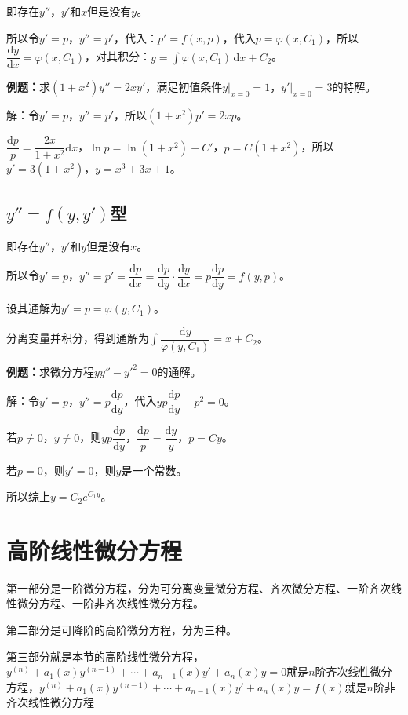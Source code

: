 \documentclass[UTF8, 12pt]{ctexart}
\begin{document}
即存在$y''$，$y'$和$x$但是没有$y$。

所以令$y'=p$，$y''=p'$，代入：$p'=f(x,p)$，代入$p=\varphi(x,C_1)$，所以$\dfrac{\textrm{d}y}{\textrm{d}x}=\varphi(x,C_1)$，对其积分：$y=\int\varphi(x,C_1)\,\textrm{d}x+C_2$。

\textbf{例题：}求$(1+x^2)y''=2xy'$，满足初值条件$y\vert_{x=0}=1$，$y'\vert_{x=0}=3$的特解。

解：令$y'=p$，$y''=p'$，所以$(1+x^2)p'=2xp$。

$\dfrac{\textrm{d}p}{p}=\dfrac{2x}{1+x^2}\textrm{d}x$，$\ln p=\ln(1+x^2)+C'$，$p=C(1+x^2)$，所以$y'=3(1+x^2)$，$y=x^3+3x+1$。

\subsection{\texorpdfstring{$y''=f(y,y')$}\ 型}

即存在$y''$，$y'$和$y$但是没有$x$。

所以令$y'=p$，$y''=p'=\dfrac{\textrm{d}p}{\textrm{d}x}=\dfrac{\textrm{d}p}{\textrm{d}y}\cdot\dfrac{\textrm{d}y}{\textrm{d}x}=p\dfrac{\textrm{d}p}{\textrm{d}y}=f(y,p)$。

设其通解为$y'=p=\varphi(y,C_1)$。

分离变量并积分，得到通解为$\displaystyle{\int\dfrac{\textrm{d}y}{\varphi(y,C_1)}=x+C_2}$。

\textbf{例题：}求微分方程$yy''-y'^2=0$的通解。

解：令$y'=p$，$y''=p\dfrac{\textrm{d}p}{\textrm{d}y}$，代入$yp\dfrac{\textrm{d}p}{\textrm{d}y}-p^2=0$。

若$p\neq0$，$y\neq0$，则$yp\dfrac{\textrm{d}p}{\textrm{d}y}$，$\dfrac{\textrm{d}p}{p}=\dfrac{\textrm{d}y}{y}$，$p=Cy$。

若$p=0$，则$y'=0$，则$y$是一个常数。

所以综上$y=C_2e^{C_1y}$。

\section{高阶线性微分方程}

第一部分是一阶微分方程，分为可分离变量微分方程、齐次微分方程、一阶齐次线性微分方程、一阶非齐次线性微分方程。

第二部分是可降阶的高阶微分方程，分为三种。

第三部分就是本节的高阶线性微分方程，$y^{(n)}+a_1(x)y^{(n-1)}+\cdots+a_{n-1}(x)y'+a_n(x)y=0$就是$n$阶齐次线性微分方程，$y^{(n)}+a_1(x)y^{(n-1)}+\cdots+a_{n-1}(x)y'+a_n(x)y=f(x)$就是$n$阶非齐次线性微分方程
\end{document}
